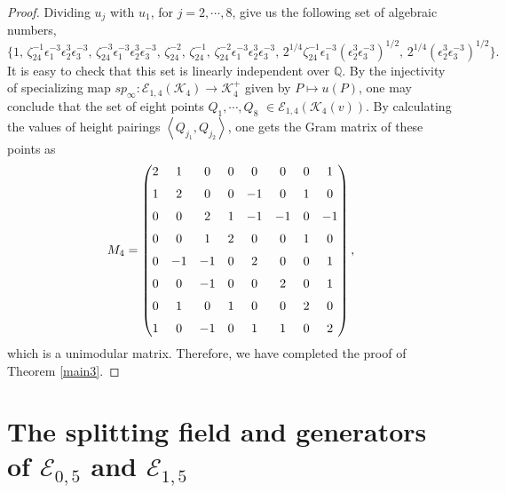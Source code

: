 \documentclass[11pt]{amsart}
\newcommand{\Q}{{\mathbb Q}}
\newcommand{\Ee}{{\mathcal E}}
\newcommand{\KK}{{\mathcal K}}
\numberwithin{equation}{section}
\numberwithin{table}{section}
\newcommand\<{\langle}
\begin{document}
\begin{proof}
	Dividing $u_j$ with $u_1$, for $j=2,\cdots, 8$, give us the following set of algebraic  numbers,
	$$\{ 1,\, \zeta_{24}^{-1} \epsilon_1^{-3} \epsilon_2^3 \epsilon_3^{-3},\,
	\zeta_{24}^{-3}\epsilon_1^{-3}\epsilon_2^3 \epsilon_3^{-3},\,\zeta_{24}^{-2},\, \zeta_{24}^{-1},\,  
	\zeta_{24}^{-2} \epsilon_1^{-3} \epsilon_2^3 \epsilon_3^{-3},\,
	2^{1/4} \zeta_{24}^{-1} \epsilon_1^{-3} (\epsilon_2^3 \epsilon_3^{-3})^{1/2},\,
	2^{1/4}  (\epsilon_2^3 \epsilon_3^{-3})^{1/2} \}.$$
	It is easy to check that  this set is linearly independent over $\Q$. 
	By the injectivity of  specializing map $sp_\infty: \Ee_{1,4}(\KK_4) \rightarrow \KK_4^+$ given by $P \mapsto u(P)$, one may conclude that the set of eight points $Q_1,\cdots, Q_8$
	$\in \Ee_{1, 4}(\KK_4(v))$.
	 	By calculating the values of  height pairings  $\left\langle  Q_{j_1}, Q_{j_2}\right\rangle $, one gets the Gram matrix of these points as
	\[M_4 = \begin{pmatrix}
	2   & 1  & 0  & 0  & 0  & 0  & 0  & 1\\ \noalign{\medskip}
	1   & 2  & 0  & 0  & -1  & 0  & 1  & 0\\ \noalign{\medskip}
	0   & 0  & 2  & 1  & -1  & -1  & 0  & -1	\\ \noalign{\medskip}
	0   & 0  & 1  & 2  & 0  & 0  & 1  & 0\\ \noalign{\medskip}
	0   & -1  & -1  & 0  & 2  & 0  & 0  & 1\\ \noalign{\medskip}
	0  & 0  & -1  & 0  & 0  & 2  & 0  & 1\\ \noalign{\medskip}
	0  & 1  & 0  & 1  & 0  & 0  & 2  & 0\\ \noalign{\medskip}
	1  & 0  & -1  & 0  & 1  & 1  & 0  & 2
	\end{pmatrix}, \]  
	which  is a unimodular matrix. Therefore, we have completed  the proof of Theorem \ref{main3}.
\end{proof}	


\section{The  splitting field and generators of  $\Ee_{0,5}$ and $\Ee_{1,5}$}
\label{E-{0,5}}
\end{document}
